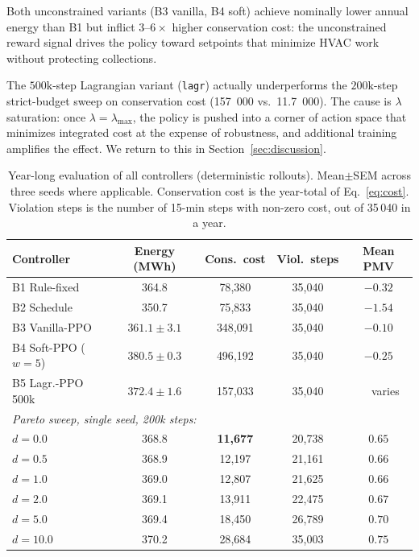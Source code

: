 \documentclass[11pt,a4paper]{article}
\begin{document}
Both unconstrained variants (B3 vanilla, B4 soft) achieve nominally
lower annual energy than B1 but inflict $3$--$6\times$ higher
conservation cost: the unconstrained reward signal drives the policy
toward setpoints that minimize HVAC work without protecting
collections.

The $500\mathrm{k}$-step Lagrangian variant (\texttt{lagr}) actually
underperforms the $200\mathrm{k}$-step strict-budget sweep on
conservation cost (\num{157}~000 vs.\ \num{11.7}~000). The cause is
$\lambda$ saturation: once $\lambda=\lambda_{\max}$, the policy is
pushed into a corner of action space that minimizes integrated cost at
the expense of robustness, and additional training amplifies the
effect. We return to this in Section~\ref{sec:discussion}.

\begin{table}[t]
\centering
\caption{Year-long evaluation of all controllers (deterministic
rollouts). Mean$\pm$SEM across three seeds where applicable.
Conservation cost is the year-total of Eq.~\eqref{eq:cost}.
Violation steps is the number of 15-min steps with non-zero cost,
out of 35\,040 in a year.}
\label{tab:headline}
\small
\setlength{\tabcolsep}{4pt}
\begin{tabular}{lcccc}
\toprule
Controller & Energy (MWh) & Cons.\ cost & Viol.\ steps & Mean PMV \\
\midrule
B1 Rule-fixed       & 364.8                       & 78{,}380   & 35{,}040 & $-0.32$ \\
B2 Schedule         & 350.7                       & 75{,}833   & 35{,}040 & $-1.54$ \\
B3 Vanilla-PPO      & $361.1\pm 3.1$              & 348{,}091  & 35{,}040 & $-0.10$ \\
B4 Soft-PPO ($w=5$) & $380.5\pm 0.3$              & 496{,}192  & 35{,}040 & $-0.25$ \\
B5 Lagr.-PPO 500k   & $372.4\pm 1.6$              & 157{,}033  & 35{,}040 & $\phantom{-}$varies \\
\midrule
\multicolumn{5}{l}{\emph{Pareto sweep, single seed, 200k steps:}}\\
$d=0.0$  & 368.8 & \textbf{11{,}677} & 20{,}738 & $0.65$ \\
$d=0.5$  & 368.9 & 12{,}197          & 21{,}161 & $0.66$ \\
$d=1.0$  & 369.0 & 12{,}807          & 21{,}625 & $0.66$ \\
$d=2.0$  & 369.1 & 13{,}911          & 22{,}475 & $0.67$ \\
$d=5.0$  & 369.4 & 18{,}450          & 26{,}789 & $0.70$ \\
$d=10.0$ & 370.2 & 28{,}684          & 35{,}003 & $0.75$ \\
\bottomrule
\end{tabular}
\end{table}
\end{document}
